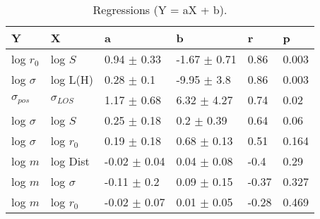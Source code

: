 \begin{table}
\centering
\caption{Regressions (Y = aX + b).}
\begin{tabular}{llllll}
\toprule
              Y &               X &                 a &                 b &      r &      p \\
\midrule
      log $r_0$ &         log $S$ &   0.94 $\pm$ 0.33 &  -1.67 $\pm$ 0.71 &   0.86 &  0.003 \\
   log $\sigma$ &        log L(H) &    0.28 $\pm$ 0.1 &   -9.95 $\pm$ 3.8 &   0.86 &  0.003 \\
 $\sigma_{pos}$ &  $\sigma_{LOS}$ &   1.17 $\pm$ 0.68 &   6.32 $\pm$ 4.27 &   0.74 &   0.02 \\
   log $\sigma$ &         log $S$ &   0.25 $\pm$ 0.18 &    0.2 $\pm$ 0.39 &   0.64 &   0.06 \\
   log $\sigma$ &     log $r_{0}$ &   0.19 $\pm$ 0.18 &   0.68 $\pm$ 0.13 &   0.51 &  0.164 \\
        log $m$ &        log Dist &  -0.02 $\pm$ 0.04 &   0.04 $\pm$ 0.08 &   -0.4 &   0.29 \\
        log $m$ &    log $\sigma$ &   -0.11 $\pm$ 0.2 &   0.09 $\pm$ 0.15 &  -0.37 &  0.327 \\
        log $m$ &     log $r_{0}$ &  -0.02 $\pm$ 0.07 &   0.01 $\pm$ 0.05 &  -0.28 &  0.469 \\
\bottomrule
\end{tabular}
\end{table}
